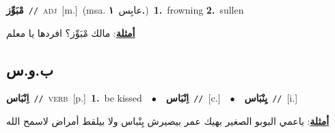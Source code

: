 \documentclass[10pt,a4paper,twoside]{article} %
\begin{document}
\begin{multicols}{2}
{\setlength\topsep{0pt}\textbf{\foreignlanguage{arabic}{مْبَوِّز}}\ {\color{gray}\texttt{//}\color{black}}\ \textsc{adj}\ [m.]\ \color{gray}(msa. \foreignlanguage{arabic}{عابِس}~\foreignlanguage{arabic}{\textbf{١.}})\color{black}\ \textbf{1.}~frowning  \textbf{2.}~sullen\  \begin{flushright}\color{gray}\foreignlanguage{arabic}{\textbf{\underline{\foreignlanguage{arabic}{أمثلة}}}: مالك مْبَوِّز؟ افردها يا معلم}\end{flushright}\color{black}} \vspace{2mm}

\vspace{-3mm}
\subsection*{\color{blue}\foreignlanguage{arabic}{ب.و.س}\color{blue}{}} 

{\setlength\topsep{0pt}\textbf{\foreignlanguage{arabic}{اِنْبَاس}}\ {\color{gray}\texttt{//}\color{black}}\ \textsc{verb}\ [p.]\ \textbf{1.}~be kissed\ \ $\bullet$\ \ \setlength\topsep{0pt}\textbf{\foreignlanguage{arabic}{اِنْبَاس}}\ {\color{gray}\texttt{//}\color{black}}\ [c.]\ \ $\bullet$\ \ \setlength\topsep{0pt}\textbf{\foreignlanguage{arabic}{يِنْبَاس}}\ {\color{gray}\texttt{//}\color{black}}\ [i.]\  \begin{flushright}\color{gray}\foreignlanguage{arabic}{\textbf{\underline{\foreignlanguage{arabic}{أمثلة}}}: ياعمي البوبو الصغير بهيك عمر بيصيرش يِنْباس ولا بيلقط أمراض لاسمح الله}\end{flushright}\color{black}} \vspace{2mm}


\end{multicols}
\end{document}
